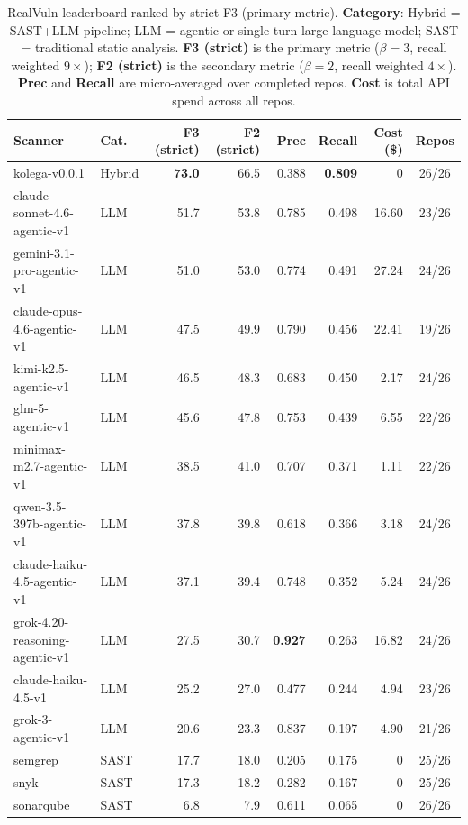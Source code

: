 \begin{table}[t]
\centering
\caption{RealVuln leaderboard ranked by strict F3 (primary metric). \textbf{Category}: Hybrid = SAST+LLM pipeline; LLM = agentic or single-turn large language model; SAST = traditional static analysis. \textbf{F3 (strict)} is the primary metric ($\beta{=}3$, recall weighted $9\times$); \textbf{F2 (strict)} is the secondary metric ($\beta{=}2$, recall weighted $4\times$). \textbf{Prec} and \textbf{Recall} are micro-averaged over completed repos. \textbf{Cost} is total API spend across all repos.}
\label{tab:leaderboard}
\small
\begin{tabular}{@{}llrrrrrc@{}}
\toprule
\textbf{Scanner} & \textbf{Cat.} & \textbf{F3 (strict)} & \textbf{F2 (strict)} & \textbf{Prec} & \textbf{Recall} & \textbf{Cost (\$)} & \textbf{Repos} \\
\midrule
kolega-v0.0.1                       & Hybrid & \textbf{73.0} & 66.5 & 0.388 & \textbf{0.809} & 0     & 26/26 \\
claude-sonnet-4.6-agentic-v1        & LLM    & 51.7          & 53.8 & 0.785 & 0.498          & 16.60 & 23/26 \\
gemini-3.1-pro-agentic-v1           & LLM    & 51.0          & 53.0 & 0.774 & 0.491          & 27.24 & 24/26 \\
claude-opus-4.6-agentic-v1          & LLM    & 47.5          & 49.9 & 0.790 & 0.456          & 22.41 & 19/26 \\
kimi-k2.5-agentic-v1                & LLM    & 46.5          & 48.3 & 0.683 & 0.450          & 2.17  & 24/26 \\
glm-5-agentic-v1                    & LLM    & 45.6          & 47.8 & 0.753 & 0.439          & 6.55  & 22/26 \\
minimax-m2.7-agentic-v1             & LLM    & 38.5          & 41.0 & 0.707 & 0.371          & 1.11  & 22/26 \\
qwen-3.5-397b-agentic-v1            & LLM    & 37.8          & 39.8 & 0.618 & 0.366          & 3.18  & 24/26 \\
claude-haiku-4.5-agentic-v1         & LLM    & 37.1          & 39.4 & 0.748 & 0.352          & 5.24  & 24/26 \\
grok-4.20-reasoning-agentic-v1      & LLM    & 27.5          & 30.7 & \textbf{0.927} & 0.263 & 16.82 & 24/26 \\
claude-haiku-4.5-v1                  & LLM    & 25.2          & 27.0 & 0.477 & 0.244          & 4.94  & 23/26 \\
grok-3-agentic-v1                   & LLM    & 20.6          & 23.3 & 0.837 & 0.197          & 4.90  & 21/26 \\
semgrep                             & SAST   & 17.7          & 18.0 & 0.205 & 0.175          & 0     & 25/26 \\
snyk                                & SAST   & 17.3          & 18.2 & 0.282 & 0.167          & 0     & 25/26 \\
sonarqube                           & SAST   & 6.8           & 7.9  & 0.611 & 0.065          & 0     & 26/26 \\
\bottomrule
\end{tabular}
\end{table}

